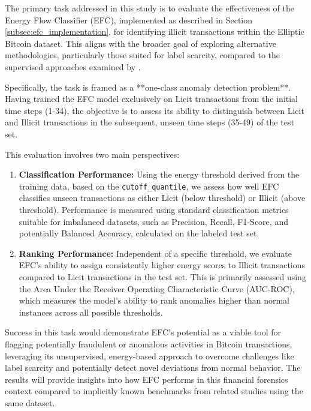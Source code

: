 \documentclass[12pt]{article}
\begin{document}
The primary task addressed in this study is to evaluate the effectiveness of the Energy Flow Classifier (EFC), implemented
as described in Section \ref{subsec:efc_implementation}, for identifying illicit transactions within the Elliptic
Bitcoin dataset. This aligns with the broader goal of exploring alternative methodologies, particularly those suited for
label scarcity, compared to the supervised approaches examined by \cite{lorenz2021machinelearningmethodsdetect}.

Specifically, the task is framed as a **one-class anomaly detection problem**. Having trained the EFC model exclusively
on Licit transactions from the initial time steps (1-34), the objective is to assess its ability to distinguish between
Licit and Illicit transactions in the subsequent, unseen time steps (35-49) of the test set.

This evaluation involves two main perspectives:

\begin{enumerate}
    \item \textbf{Classification Performance:} Using the energy threshold derived from the training data, based on the
      \texttt{cutoff\_quantile}, we assess how well EFC classifies unseen transactions as either Licit (below threshold)
      or Illicit (above threshold). Performance is measured using standard classification metrics suitable for imbalanced
      datasets, such as Precision, Recall, F1-Score, and potentially Balanced Accuracy, calculated on the labeled test set.
    \item \textbf{Ranking Performance:} Independent of a specific threshold, we evaluate EFC's ability to assign consistently
      higher energy scores to Illicit transactions compared to Licit transactions in the test set. This is primarily
      assessed using the Area Under the Receiver Operating Characteristic Curve (AUC-ROC), which measures the model's
      ability to rank anomalies higher than normal instances across all possible thresholds.
\end{enumerate}

Success in this task would demonstrate EFC's potential as a viable tool for flagging potentially fraudulent or anomalous
activities in Bitcoin transactions, leveraging its unsupervised, energy-based approach to overcome challenges like label
scarcity and potentially detect novel deviations from normal behavior. The results will provide insights into how EFC
performs in this financial forensics context compared to implicitly known benchmarks from related studies using the same
dataset.
\end{document}
